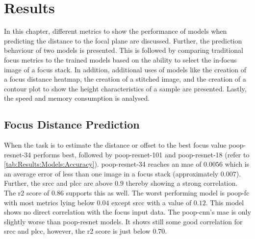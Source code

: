 \chapter{Results}
\label{ch:Results}

In this chapter, different metrics to show the performance of models when predicting the distance to the focal plane are discussed. Further, the prediction behaviour of two models is presented. This is followed by comparing traditional focus metrics to the trained models based on the ability to select the in-focus image of a focus stack. In addition, additional uses of models like the creation of a focus distance heatmap, the creation of a stitched image, and the creation of a contour plot to show the height characteristics of a sample are presented. Lastly, the speed and memory consumption is analysed.



\section{Focus Distance Prediction}
\label{sec:Results:FocusDistance}

When the task is to estimate the distance or offset to the best focus value \acs{poop}-\acs{resnet}-34 performs best, followed by \acs{poop}-\acs{resnet}-101 and \acs{poop}-\acs{resnet}-18 (refer to \autoref{tab:Results:Models:Accuracy}). \Acs{poop}-\acs{resnet}-34 reaches an \ac{mae} of $0.0056$ which is an average error of less than one image in a focus stack (approximately $0.007$). Further, the \ac{srcc} and \ac{plcc} are above $0.9$ thereby showing a strong correlation. The \ac{r2} score of $0.86$ supports this as well.
The worst performing model is \acs{poop}-\acs{fc} with most metrics lying below $0.04$ except \ac{srcc} with a value of $0.12$. This model shows no direct correlation with the focus input data. The \acs{poop}-\acs{cnn}'s \ac{mae} is only slightly worse than \acs{poop}-\acs{resnet} models. It shows still some good correlation for \ac{srcc} and \ac{plcc}, however, the \ac{r2} score is just below $0.70$. 

